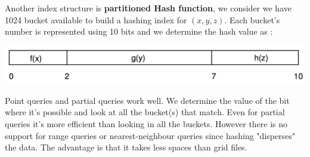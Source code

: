 \documentclass[12pt,a4paper]{article}
\begin{document}
Another index structure is \textbf{partitioned Hash function}, we consider we have 1024 bucket available to build a hashing index for $(x,y,z)$. Each bucket's number  is represented using 10 bits and we determine the hash value as :
\begin{center}
\includegraphics[scale=0.4]{img/img54.png}
\end{center}
Point queries and partial queries work well. We determine the value of the bit where it's possible and look at all the bucket(s) that match. Even for partial queries it's more efficient than looking in all the buckets.
However there is no support for range queries or nearest-neighbour queries since hashing "disperses" the data. The advantage is that it takes less spaces than grid files.\\
\end{document}
